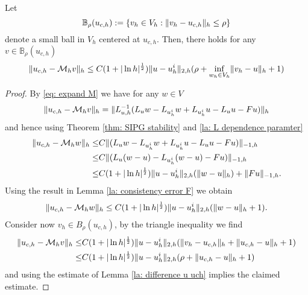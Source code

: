 \begin{lemma} \label{la: mapping property of M}
	Let 
	\[
		\mathbb B_\rho(u_{c,h}):=\{v_h \in V_h: \lVert v_h - u_{c,h} \rVert_{h} \leq \rho\}
	\]
	denote a small ball in $V_h$ centered at $u_{c,h}$. 
	Then, there holds for any $v \in \mathbb B_\rho(u_{c,h})$
	\[
		\lVert u_{c,h} - \mathcal M_h v \rVert_{h} \leq C (1+|\ln h|^{\frac 1 2}) \lVert u - u^i_h \rVert_{2,h} (\rho+ \inf_{w_h \in V_h} \lVert v_h-u \rVert_{h} +1)
	\] 
\end{lemma}
\begin{proof}
	By \eqref{eq: expand M} we have for any $w \in V$
	\begin{align}
		\lVert u_{c,h} - \mathcal M_h v \rVert_{h} = \lVert L_{u,h}^{-1}(L_u w - L_{u^i_h} w + L_{u^i_h}u - L_u u - Fu) \rVert_{h}
	\end{align}
	and hence using Theorem \ref{thm: SIPG stability} and \ref{la: L dependence paramter}
	\begin{align*}
		\lVert u_{c,h} - \mathcal M_h w \rVert_{h} 
		\leq& C\lVert (L_u w - L_{u^i_h} w + L_{u^i_h} u- L_u u - Fu) \rVert_{-1,h} \nonumber\\
		\leq& C\lVert (L_u (w-u) - L_{u^i_h} (w-u) - Fu) \rVert_{-1,h} \nonumber\\
				\leq& C (1+|\ln h|^{\frac 1 2}) \lVert u - u^i_h \rVert_{2,h} (\lVert w-u \rVert_{h}) +\lVert Fu \rVert_{-1,h}.
	\end{align*}
	Using the result in Lemma \ref{la: consistency error F} we obtain
	\begin{align*}
		\lVert u_{c,h} - \mathcal M_h w \rVert_{h} \leq C (1+|\ln h|^{\frac 1 2}) \lVert u - u^i_h \rVert_{2,h} (\lVert w-u \rVert_{h}+1).
	\end{align*}
	Consider now $v_h \in B_\rho(u_{c,h})$, by the triangle inequality we find 
	\begin{align}
		\lVert u_{c,h} - \mathcal M_h v \rVert_{h} 
			\leq& C (1+|\ln h|^{\frac 1 2}) \lVert u - u^i_h \rVert_{2,h} (\lVert v_h-u_{c,h} \rVert_{h}+ \lVert u_{c,h}-u \rVert_{h} +1) \nonumber \\
			\leq& C (1+|\ln h|^{\frac 1 2}) \lVert u - u^i_h \rVert_{2,h} (\rho+ \lVert u_{c,h}-u \rVert_{h} +1)			
	\end{align}
	and using the estimate of Lemma \ref{la: difference u uch} implies the claimed estimate.
\end{proof}

